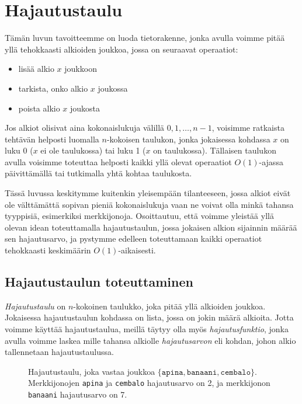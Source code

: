 \chapter{Hajautustaulu}

Tämän luvun tavoitteemme on luoda tietorakenne,
jonka avulla voimme pitää yllä tehokkaasti alkioiden joukkoa,
jossa on seuraavat operaatiot:

\begin{itemize}
\item lisää alkio $x$ joukkoon
\item tarkista, onko alkio $x$ joukossa
\item poista alkio $x$ joukosta
\end{itemize}

Jos alkiot olisivat aina kokonaislukuja
välillä $0,1,\ldots,n-1$, voisimme ratkaista tehtävän
helposti luomalla $n$-kokoisen taulukon, jonka
jokaisessa kohdassa $x$ on luku 0 ($x$ ei ole taulukossa)
tai luku 1 ($x$ on taulukossa).
Tällaisen taulukon avulla voisimme toteuttaa
helposti kaikki yllä olevat operaatiot $O(1)$-ajassa
päivittämällä tai tutkimalla yhtä kohtaa taulukosta.

Tässä luvussa keskitymme kuitenkin yleisempään tilanteeseen,
jossa alkiot eivät ole välttämättä sopivan pieniä kokonaislukuja
vaan ne voivat olla minkä tahansa tyyppisiä, esimerkiksi merkkijonoja.
Osoittautuu, että voimme yleistää yllä olevan idean toteuttamalla
hajautustaulun, jossa jokaisen alkion sijainnin määrää sen hajautusarvo,
ja pystymme edelleen toteuttamaan kaikki operaatiot
tehokkaasti keskimäärin $O(1)$-aikaisesti.

\section{Hajautustaulun toteuttaminen}

\emph{Hajautustaulu} on $n$-kokoinen taulukko,
joka pitää yllä alkioiden joukkoa.
Jokaisessa hajautustaulun kohdassa on lista,
jossa on jokin määrä alkioita.
Jotta voimme käyttää hajautustaulua,
meillä täytyy olla myös \emph{hajautusfunktio},
jonka avulla voimme laskea mille tahansa alkiolle
\emph{hajautusarvon} eli kohdan, johon alkio
tallennetaan hajautustaulussa.

\begin{figure}
\caption{Hajautustaulu, joka vastaa joukkoa $\{\texttt{apina},\texttt{banaani},\texttt{cembalo}\}$.
Merkkijonojen \texttt{apina} ja \texttt{cembalo} hajautusarvo on 2, ja merkkijonon
\texttt{banaani} hajautusarvo on 7.}
\label{fig:hajtau}
\end{figure}

